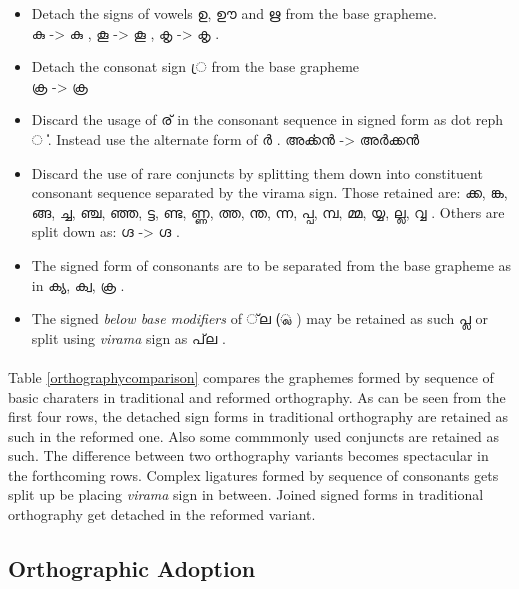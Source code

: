 \documentclass[10pt]{article}
\begin{document}
\begin{itemize}
\item
Detach the signs of vowels {\manjari ഉ, ഊ and ഋ } from the base grapheme.\\
{\manjari കു } -> {\raghu കു } ,
{\manjari കൂ } -> {\raghu കൂ } ,
{\manjari കൃ } -> {\raghu കൃ } .
\item 
Detach the consonat sign {\manjari  ്ര } from the base grapheme \\
{\manjari ക്ര  } -> {\raghu ക്ര  } 
\item
Discard the usage of {\manjari ര് } in the consonant sequence in signed form as dot reph {\manjari ൎ }. Instead use the alternate form of {\manjari ർ }. {\manjari അൎക്കൻ } -> {\manjari അർക്കൻ }

\item
Discard the use of rare conjuncts by splitting them down into constituent consonant sequence separated by the virama sign. Those retained are: {\manjari ക്ക, ങ്ക, ങ്ങ, ച്ച, ഞ്ച, ഞ്ഞ, ട്ട, ണ്ട, ണ്ണ, ത്ത, ന്ത, ന്ന, പ്പ, മ്പ, മ്മ, യ്യ, ല്ല, വ്വ }. Others are split down as: {\manjari ഗ്ദ } -> {\raghu ഗ്ദ }. 

\item
The signed form of consonants are to be separated from the base grapheme as in {\raghu ക്യ, ക്വ, ക്ര }.

\item
The signed \textit{below base modifiers} of {\manjari  ്‌ല  (്ല )  } may be retained as such {\manjari പ്ല } or split using \textit{virama} sign as {\manjari  പ്‌ല }.

\end{itemize}

\paragraph{}
Table \ref{orthographycomparison} compares the graphemes formed by sequence of basic charaters in traditional and reformed orthography. As can be seen from the first four rows, the detached sign forms in traditional orthography are retained as such in the reformed one. Also some commmonly used conjuncts are retained as such. The difference between two orthography variants becomes spectacular in the forthcoming rows. Complex ligatures formed by sequence of consonants gets split up be placing \textit{virama} sign in between. Joined signed forms in traditional orthography get detached in the reformed variant.


\subsection{Orthographic Adoption}
\end{document}
